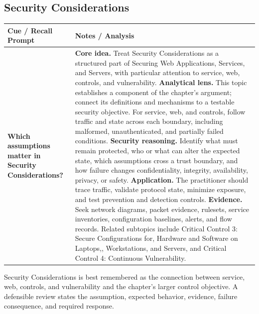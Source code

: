 \documentclass[11pt]{article}
\newcommand{\CornellHeader}{%
\rowcolor{Navy}\color{white}\bfseries Cue / Recall Prompt & \color{white}\bfseries Notes / Analysis\\\hline}
\newcommand{\CornellRow}[2]{%
\cellcolor{CueGray}\RaggedRight\textbf{#1} & \RaggedRight #2\\\hline}
\begin{document}
\subsection*{Security Considerations}
\begin{longtable}{>{\RaggedRight\arraybackslash}p{}|>{\RaggedRight\arraybackslash}p{}}
\CornellHeader
\CornellRow{Which assumptions matter in Security Considerations?}{\textbf{Core idea.} Treat Security Considerations as a structured part of Securing Web Applications, Services, and Servers, with particular attention to service, web, controls, and vulnerability. \textbf{Analytical lens.} This topic establishes a component of the chapter's argument; connect its definitions and mechanisms to a testable security objective. For service, web, and controls, follow traffic and state across each boundary, including malformed, unauthenticated, and partially failed conditions. \textbf{Security reasoning.} Identify what must remain protected, who or what can alter the expected state, which assumptions cross a trust boundary, and how failure changes confidentiality, integrity, availability, privacy, or safety. \textbf{Application.} The practitioner should trace traffic, validate protocol state, minimize exposure, and test prevention and detection controls. \textbf{Evidence.} Seek network diagrams, packet evidence, rulesets, service inventories, configuration baselines, alerts, and flow records. Related subtopics include Critical Control 3: Secure Configurations for, Hardware and Software on Laptops,, Workstations, and Servers, and Critical Control 4: Continuous Vulnerability.}
\end{longtable}
\begin{topicsummary}
Security Considerations is best remembered as the connection between service, web, controls, and vulnerability and the chapter's larger control objective. A defensible review states the assumption, expected behavior, evidence, failure consequence, and required response.
\end{topicsummary}
\end{document}

